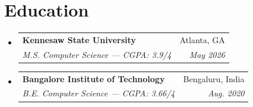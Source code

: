 \documentclass[letterpaper,11pt]{article}
\makeatletter
\newcommand{\resumeSubheading}[4]{
  \vspace{-2pt}\item
    \begin{tabular*}{0.97\textwidth}[t]{l@{\extracolsep{\fill}}r}
      \textbf{#1} & #2 \\
      \textit{\small#3} & \textit{\small #4} \\
    \end{tabular*}\vspace{-7pt}
}
\newcommand{\resumeSubHeadingListStart}{\begin{itemize}[leftmargin=0.15in, label={}]}
\newcommand{\resumeSubHeadingListEnd}{\end{itemize}}
\makeatother
\begin{document}
\section{Education}
  \resumeSubHeadingListStart
    \resumeSubheading
      {Kennesaw State University}{Atlanta, GA}
      {M.S. Computer Science --- CGPA: 3.9/4}{May 2026}
      \vspace{-2pt}
    \resumeSubheading
      {Bangalore Institute of Technology}{Bengaluru, India}
      {B.E. Computer Science --- CGPA: 3.66/4}{Aug. 2020}
      \vspace{-5pt}
  \resumeSubHeadingListEnd
\end{document}
